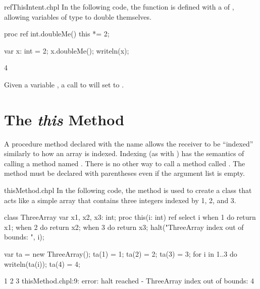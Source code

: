 \begin{chapelexample}{refThisIntent.chpl}
In the following code, the  function is defined with a
 of , allowing variables of type  to
double themselves.
\begin{chapel}
proc ref int.doubleMe() { this *= 2; }
\end{chapel}
\begin{chapelpost}
var x: int = 2;
x.doubleMe();
writeln(x);
\end{chapelpost}
\begin{chapeloutput}
4
\end{chapeloutput}
Given a variable , a call to  will set 
to .
\end{chapelexample}

\section{The {\em this} Method}
\label{The_this_Method}

A procedure method declared with the name  allows the receiver to be
``indexed'' similarly to how an array is indexed.  Indexing (as with
) has the semantics of calling a method
named .  There is no other way to call a method
called .  The  method must be declared with
parentheses even if the argument list is empty.

\begin{chapelexample}{thisMethod.chpl}
In the following code, the  method is used to create a
class that acts like a simple array that contains three integers
indexed by 1, 2, and 3.
\begin{chapel}
class ThreeArray {
  var x1, x2, x3: int;
  proc this(i: int) ref {
    select i {
      when 1 do return x1;
      when 2 do return x2;
      when 3 do return x3;
    }
    halt("ThreeArray index out of bounds: ", i);
  }
}
\end{chapel}
\begin{chapelpost}
var ta = new ThreeArray();
ta(1) = 1;
ta(2) = 2;
ta(3) = 3;
for i in 1..3 do
  writeln(ta(i));
ta(4) = 4;
\end{chapelpost}
\begin{chapeloutput}
1
2
3
thisMethod.chpl:9: error: halt reached - ThreeArray index out of bounds: 4
\end{chapeloutput}
\end{chapelexample}

